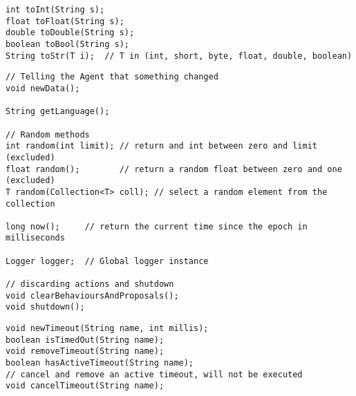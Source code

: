 \begin{small}
\begin{lstlisting}
int toInt(String s);
float toFloat(String s);
double toDouble(String s);
boolean toBool(String s);
String toStr(T i);  // T in (int, short, byte, float, double, boolean)
\end{lstlisting}
\end{small}

\begin{small}
\begin{lstlisting}
// Telling the Agent that something changed
void newData();

String getLanguage();

// Random methods
int random(int limit); // return and int between zero and limit (excluded)
float random();        // return a random float between zero and one (excluded)
T random(Collection<T> coll); // select a random element from the collection

long now();     // return the current time since the epoch in milliseconds

Logger logger;  // Global logger instance

// discarding actions and shutdown
void clearBehavioursAndProposals();
void shutdown();
\end{lstlisting}
\end{small}

\begin{small}
\begin{lstlisting}
void newTimeout(String name, int millis);
boolean isTimedOut(String name);
void removeTimeout(String name);
boolean hasActiveTimeout(String name);
// cancel and remove an active timeout, will not be executed
void cancelTimeout(String name);
\end{lstlisting}
\end{small}

